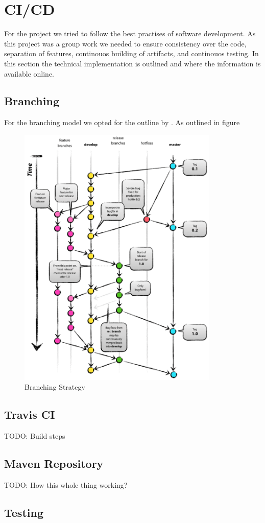 \section{CI/CD}
For the project we tried to follow the best practises of software development. As this project was a group work we needed to ensure consistency over the code, separation of features, continouos building of artifacts, and continouos testing. In this section the technical implementation is outlined and where the information is available online.

\subsection{Branching}
For the branching model we opted for the outline by \cite{Branching}. As outlined in figure

\begin{figure}[h]
	\centering
	\includegraphics[height=5in]{./section-chapter3/images/branching.png}
	\caption{Branching Strategy}
	\label{fig:branching}
\end{figure}

\subsection{Travis CI}
TODO: Build steps

\subsection{Maven Repository}
TODO: How this whole thing working?

\subsection{Testing}

